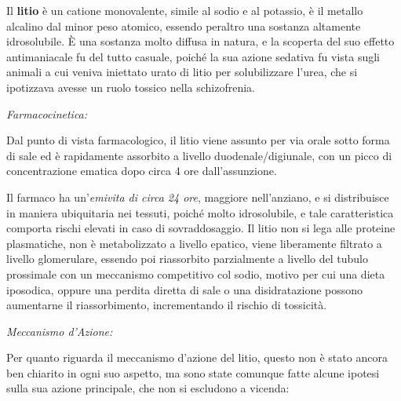 \documentclass[]{article}
\begin{document}
Il \textbf{litio} è un catione monovalente, simile al sodio e al
potassio, è il metallo alcalino dal minor peso atomico, essendo peraltro
una sostanza altamente idrosolubile. È una sostanza molto diffusa in
natura, e la scoperta del suo effetto antimaniacale fu del tutto
casuale, poiché la sua azione sedativa fu vista sugli animali a cui
veniva iniettato urato di litio per solubilizzare l'urea, che si
ipotizzava avesse un ruolo tossico nella schizofrenia.

\emph{\emph{Farmacocinetica:}}

Dal punto di vista farmacologico, il litio viene assunto per via orale
sotto forma di sale ed è rapidamente assorbito a livello
duodenale/digiunale, con un picco di concentrazione ematica dopo circa 4
ore dall'assunzione.

Il farmaco ha un'\emph{emivita di circa 24 ore}, maggiore nell'anziano,
e si distribuisce in maniera ubiquitaria nei tessuti, poiché molto
idrosolubile, e tale caratteristica comporta rischi elevati in caso di
sovraddosaggio. Il litio non si lega alle proteine plasmatiche, non è
metabolizzato a livello epatico, viene liberamente filtrato a livello
glomerulare, essendo poi riassorbito parzialmente a livello del tubulo
prossimale con un meccanismo competitivo col sodio, motivo per cui una
dieta iposodica, oppure una perdita diretta di sale o una disidratazione
possono aumentarne il riassorbimento, incrementando il rischio di
tossicità.

\emph{\emph{Meccanismo d'Azione:}}

Per quanto riguarda il meccanismo d'azione del litio, questo non è stato
ancora ben chiarito in ogni suo aspetto, ma sono state comunque fatte
alcune ipotesi sulla sua azione principale, che non si escludono a
vicenda:
\end{document}
